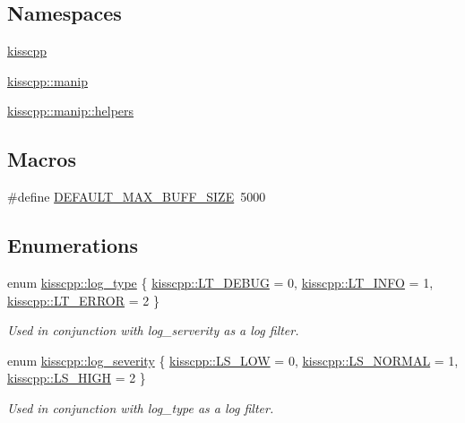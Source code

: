 \subsection*{Namespaces}
\begin{DoxyCompactItemize}
\item 
\hyperlink{a00089}{kisscpp}
\item 
\hyperlink{a00090}{kisscpp\-::manip}
\item 
\hyperlink{a00091}{kisscpp\-::manip\-::helpers}
\end{DoxyCompactItemize}
\subsection*{Macros}
\begin{DoxyCompactItemize}
\item 
\#define \hyperlink{a00067_a4ea9e3032a294c731fcfa3401f82ea98}{D\-E\-F\-A\-U\-L\-T\-\_\-\-M\-A\-X\-\_\-\-B\-U\-F\-F\-\_\-\-S\-I\-Z\-E}~5000
\end{DoxyCompactItemize}
\subsection*{Enumerations}
\begin{DoxyCompactItemize}
\item 
enum \hyperlink{a00089_a18db16d1f4c281bec16e637c56b0cc88}{kisscpp\-::log\-\_\-type} \{ \hyperlink{a00089_a18db16d1f4c281bec16e637c56b0cc88a5534dcd03ff720ecbe64b0c91ea3b228}{kisscpp\-::\-L\-T\-\_\-\-D\-E\-B\-U\-G} = 0, 
\hyperlink{a00089_a18db16d1f4c281bec16e637c56b0cc88ad1c780d761d1eec16905dd8e306764aa}{kisscpp\-::\-L\-T\-\_\-\-I\-N\-F\-O} = 1, 
\hyperlink{a00089_a18db16d1f4c281bec16e637c56b0cc88ad444adf89c01661a3f2cacd8baea3d90}{kisscpp\-::\-L\-T\-\_\-\-E\-R\-R\-O\-R} = 2
 \}
\begin{DoxyCompactList}\small\item\em Used in conjunction with log\-\_\-serverity as a log filter. \end{DoxyCompactList}\item 
enum \hyperlink{a00089_a2479a56cdedf21357ca5c68adc699d00}{kisscpp\-::log\-\_\-severity} \{ \hyperlink{a00089_a2479a56cdedf21357ca5c68adc699d00af0d1f4c43feb2c79cbd2c44cba171b9f}{kisscpp\-::\-L\-S\-\_\-\-L\-O\-W} = 0, 
\hyperlink{a00089_a2479a56cdedf21357ca5c68adc699d00aac284c5fe534f527e04da9327a0e484e}{kisscpp\-::\-L\-S\-\_\-\-N\-O\-R\-M\-A\-L} = 1, 
\hyperlink{a00089_a2479a56cdedf21357ca5c68adc699d00a98a2f9d2011b440e4a890b9c0dbb7bc2}{kisscpp\-::\-L\-S\-\_\-\-H\-I\-G\-H} = 2
 \}
\begin{DoxyCompactList}\small\item\em Used in conjunction with log\-\_\-type as a log filter. \end{DoxyCompactList}\end{DoxyCompactItemize}
